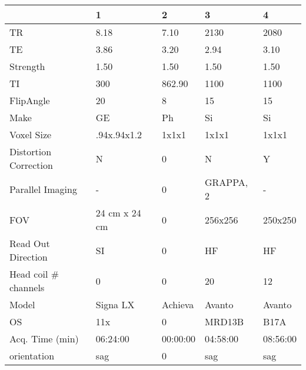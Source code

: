 \begin{table}
[]
\centering
\begin{tabular}{lllll}
\toprule
{} & 1 & 2 & 3 & 4 \\
\midrule
TR                    &               8.18 &               7.10 &                 2130 &                 2080 \\
TE                    &               3.86 &               3.20 &                 2.94 &                 3.10 \\
Strength              &               1.50 &               1.50 &                 1.50 &                 1.50 \\
TI                    &                300 &             862.90 &                 1100 &                 1100 \\
FlipAngle             &                 20 &                  8 &                   15 &                   15 \\
Make                  &                 GE &                 Ph &                   Si &                   Si \\
Voxel Size            &        .94x.94x1.2 &              1x1x1 &                1x1x1 &                1x1x1 \\
Distortion Correction &                  N &                  0 &                    N &                    Y \\
Parallel Imaging      &                  - &                  0 &            GRAPPA, 2 &                    - \\
FOV                   &      24 cm x 24 cm &                  0 &              256x256 &              250x250 \\
Read Out Direction    &                 SI &                  0 &                   HF &                   HF \\
Head coil \# channels  &                  0 &                  0 &                   20 &                   12 \\
Model                 &           Signa LX &            Achieva &               Avanto &               Avanto \\
OS                    &                11x &                  0 &               MRD13B &                 B17A \\
Acq. Time (min)       &           06:24:00 &           00:00:00 &             04:58:00 &             08:56:00 \\
orientation           &                sag &                  0 &                  sag &                  sag \\

\end{tabular}
\end{table}
